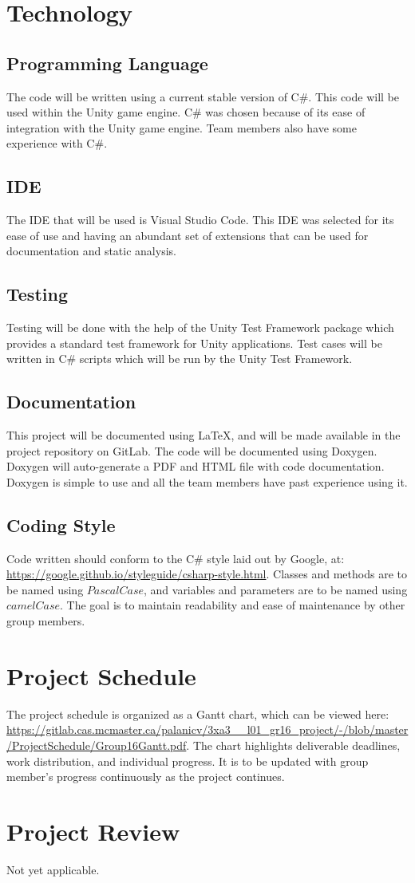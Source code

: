 \documentclass[12pt,letterpaper]{article}
\begin{document}
\section{Technology}
\subsection{Programming Language}
The code will be written using a current stable version of C\#. This code will be used within the Unity game engine. C\# was chosen because of its ease of integration with the Unity game engine. Team members also have some experience with C\#.
\subsection{IDE}
The IDE that will be used is Visual Studio Code. This IDE was selected for its ease of use and having an abundant set of extensions that can be used for documentation and static analysis.
\subsection{Testing}
Testing will be done with the help of the Unity Test Framework package which provides a standard test framework for Unity applications. Test cases will be written in C\# scripts which will be run by the Unity Test Framework.
\subsection{Documentation}
This project will be documented using LaTeX, and will be made available in the project repository on GitLab. The code will be documented using Doxygen. Doxygen will auto-generate a PDF and HTML file with code documentation. Doxygen is simple to use and all the team members have past experience using it.

\subsection{Coding Style}
Code written should conform to the C\# style laid out by Google, at: \url{https://google.github.io/styleguide/csharp-style.html}. Classes and methods are to be named using $PascalCase$, and variables and parameters are to be named using $camelCase$.
\newline
The goal is to maintain readability and ease of maintenance by other group members.

\section{Project Schedule}
The project schedule is organized as a Gantt chart, which can be viewed here:
\url{https://gitlab.cas.mcmaster.ca/palanicv/3xa3__l01_gr16_project/-/blob/master/ProjectSchedule/Group16Gantt.pdf}.
\newline
The chart highlights deliverable deadlines, work distribution, and individual progress. It is to be updated with group member's progress continuously as the project continues.

\section{Project Review}
Not yet applicable.
\end{document}
